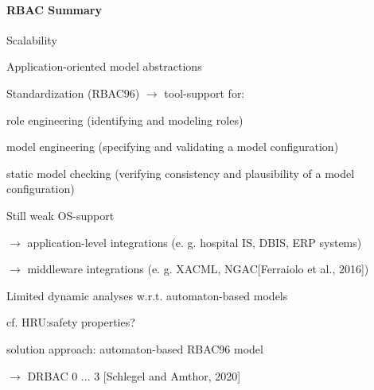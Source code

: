 \documentclass[a4paper]{article}
\begin{document}
\begin{multicols}{3}
    \paragraph{RBAC Summary}
    \begin{itemize*}
        \item Scalability
        \item Application-oriented model abstractions
        \item Standardization (RBAC96) $\rightarrow$ tool-support for:
              \begin{itemize*}
                  \item role engineering (identifying and modeling roles)
                  \item model engineering (specifying and validating a model configuration)
                  \item static model checking (verifying consistency and plausibility of a model configuration)
              \end{itemize*}
        \item Still weak OS-support
              \begin{itemize*}
                  \item $\rightarrow$ application-level integrations (e. g. hospital IS, DBIS, ERP systems)
                  \item $\rightarrow$ middleware integrations (e. g. XACML, NGAC[Ferraiolo et al., 2016])
              \end{itemize*}
        \item Limited dynamic analyses w.r.t. automaton-based models
              \begin{itemize*}
                  \item cf. HRU:safety properties?
                  \item solution approach: automaton-based RBAC96 model
                  \item $\rightarrow$ DRBAC 0 ... 3 [Schlegel and Amthor, 2020]
              \end{itemize*}
    \end{itemize*}



\end{multicols}
\end{document}
